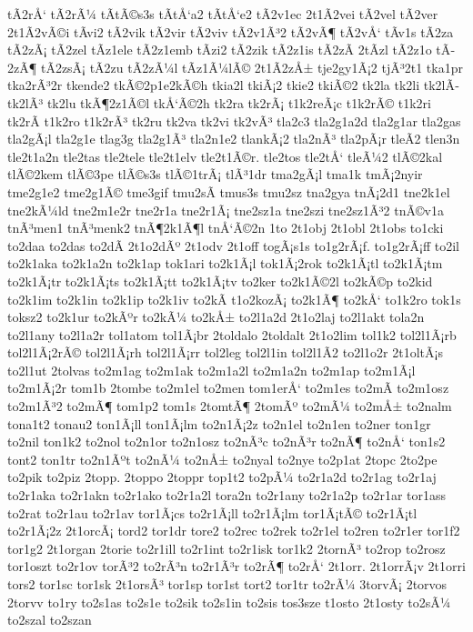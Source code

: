 {tÃ­2rÅ‘
tÃ­2rÃ¼
tÃ­tÃ©s3s
tÃ­tÅ‘a2
tÃ­tÅ‘e2
tÃ­2v1ec
2t1Ã­2vei
tÃ­2vel
tÃ­2ver
2t1Ã­2vÃ©i
tÃ­vi2
tÃ­2vik
tÃ­2vir
tÃ­2viv
tÃ­2v1Ã³2
tÃ­2vÃ¶
tÃ­2vÅ‘
tÃ­v1s
tÃ­2za
tÃ­2zÃ¡
tÃ­2zel
tÃ­z1ele
tÃ­2z1emb
tÃ­zi2
tÃ­2zik
tÃ­2z1is
tÃ­2zÃ­
2tÃ­zl
tÃ­2z1o
tÃ­2zÃ¶
tÃ­2zsÃ¡
tÃ­2zu
tÃ­2zÃ¼l
tÃ­z1Ã¼lÃ©
2t1Ã­2zÅ±
tje2gy1Ã¡2
tjÃ³2t1
tka1pr
tka2rÃ³2r
tkende2
tkÃ©2p1e2kÃ©h
tkia2l
tkiÃ¡2
tkie2
tkiÃ©2
tk2la
tk2li
tk2lÃ­
tk2lÃ³
tk2lu
tkÃ¶2z1Ã©l
tkÅ‘Ã©2h
tk2ra
tk2rÃ¡
t1k2reÃ¡c
t1k2rÃ©
t1k2ri
tk2rÃ­
t1k2ro
t1k2rÃ³
tk2ru
tk2va
tk2vi
tk2vÃ³
tla2c3
tla2g1a2d
tla2g1ar
tla2gas
tla2gÃ¡l
tla2g1e
tlag3g
tla2g1Ã³
tla2n1e2
tlankÃ¡2
tla2nÃ³
tla2pÃ¡r
tleÃ­2
tlen3n
tle2t1a2n
tle2tas
tle2tele
tle2t1elv
tle2t1Ã©r.
tle2tos
tle2tÅ‘
tleÃ¼2
tlÃ©2kal
tlÃ©2kem
tlÃ©3pe
tlÃ©s3s
tlÃ©1trÃ¡
tlÃ³1dr
tma2gÃ¡l
tma1k
tmÃ¡2nyir
tme2g1e2
tme2g1Ã©
tme3gif
tmu2sÃ­
tmus3s
tmu2sz
tna2gya
tnÃ¡2d1
tne2k1el
tne2kÃ¼ld
tne2m1e2r
tne2r1a
tne2r1Ã¡
tne2sz1a
tne2szi
tne2sz1Ã³2
tnÃ©v1a
tnÃ³men1
tnÃ³menk2
tnÃ¶2k1Ã¶l
tnÅ‘Ã©2n
1to
2t1obj
2t1obl
2t1obs
to1cki
to2daa
to2das
to2dÃ­
2t1o2dÃº
2t1odv
2t1off
togÃ¡s1s
to1g2rÃ¡f.
to1g2rÃ¡ff
to2il
to2k1aka
to2k1a2n
to2k1ap
tok1ari
to2k1Ã¡l
tok1Ã¡2rok
to2k1Ã¡tl
to2k1Ã¡tm
to2k1Ã¡tr
to2k1Ã¡ts
to2k1Ã¡tt
to2k1Ã¡tv
to2ker
to2k1Ã©2l
to2kÃ©p
to2kid
to2k1im
to2k1in
to2k1ip
to2k1iv
to2kÃ­
t1o2kozÃ¡
to2k1Ã¶
to2kÅ‘
to1k2ro
tok1s
toksz2
to2k1ur
to2kÃºr
to2kÃ¼
to2kÅ±
to2l1a2d
2t1o2laj
to2l1akt
tola2n
to2l1any
to2l1a2r
tol1atom
tol1Ã¡br
2toldalo
2toldalt
2t1o2lim
tol1k2
tol2l1Ã¡rb
tol2l1Ã¡2rÃ©
tol2l1Ã¡rh
tol2l1Ã¡rr
tol2leg
tol2l1in
tol2l1Ã­2
to2l1o2r
2t1oltÃ¡s
to2l1ut
2tolvas
to2m1ag
to2m1ak
to2m1a2l
to2m1a2n
to2m1ap
to2m1Ã¡l
to2m1Ã¡2r
tom1b
2tombe
to2m1el
to2men
tom1erÅ‘
to2m1es
to2mÃ­
to2m1osz
to2m1Ã³2
to2mÃ¶
tom1p2
tom1s
2tomtÃ¶
2tomÃº
to2mÃ¼
to2mÅ±
to2nalm
tona1t2
tonau2
ton1Ã¡ll
ton1Ã¡lm
to2n1Ã¡2z
to2n1el
to2n1en
to2ner
ton1gr
to2nil
ton1k2
to2nol
to2n1or
to2n1osz
to2nÃ³c
to2nÃ³r
to2nÃ¶
to2nÅ‘
ton1s2
tont2
ton1tr
to2n1Ãºt
to2nÃ¼
to2nÅ±
to2nyal
to2nye
to2p1at
2topc
2to2pe
to2pik
to2piz
2topp.
2toppo
2toppr
top1t2
to2pÃ¼
to2r1a2d
to2r1ag
to2r1aj
to2r1aka
to2r1akn
to2r1ako
to2r1a2l
tora2n
to2r1any
to2r1a2p
to2r1ar
tor1ass
to2rat
to2r1au
to2r1av
tor1Ã¡cs
to2r1Ã¡ll
to2r1Ã¡lm
tor1Ã¡tÃ©
to2r1Ã¡tl
to2r1Ã¡2z
2t1orcÃ¡
tord2
tor1dr
tore2
to2rec
to2rek
to2r1el
to2ren
to2r1er
tor1f2
tor1g2
2t1organ
2torie
to2r1ill
to2r1int
to2r1isk
tor1k2
2tornÃ³
to2rop
to2rosz
tor1oszt
to2r1ov
torÃ³2
to2rÃ³n
to2r1Ã³r
to2rÃ¶
to2rÅ‘
2t1orr.
2t1orrÃ¡v
2t1orri
tors2
tor1sc
tor1sk
2t1orsÃ³
tor1sp
tor1st
tort2
tor1tr
to2rÃ¼
3torvÃ¡
2torvos
2torvv
to1ry
to2s1as
to2s1e
to2sik
to2s1in
to2sis
tos3sze
t1osto
2t1osty
to2sÃ¼
to2szal
to2szan
}
